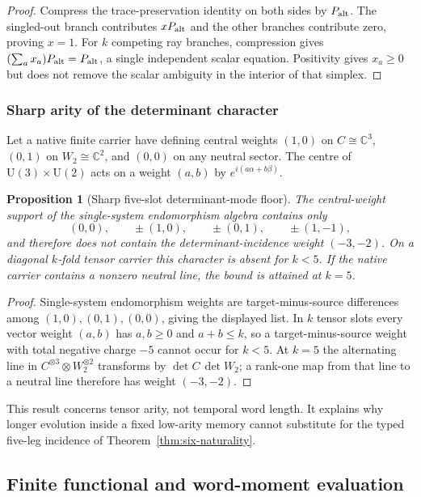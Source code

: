 \documentclass[11pt]{article}
\numberwithin{equation}{section}
\newtheorem{proposition}[theorem]{Proposition}
\theoremstyle{definition}
\theoremstyle{remark}
\newcommand{\C}{\mathbb C}
\newcommand{\U}{\mathrm U}
\begin{document}
\begin{proof}
Compress the trace-preservation identity on both sides by $P_{\rm alt}$.
The singled-out branch contributes $xP_{\rm alt}$ and the other branches
contribute zero, proving $x=1$.  For $k$ competing ray branches, compression
gives $(\sum_a x_a)P_{\rm alt}=P_{\rm alt}$, a single independent scalar
equation.  Positivity gives $x_a\ge0$ but does not remove the scalar
ambiguity in the interior of that simplex.
\end{proof}


\subsubsection{Sharp arity of the determinant character}

Let a native finite carrier have defining central weights $(1,0)$ on
$C\cong\C^3$, $(0,1)$ on $W_2\cong\C^2$, and $(0,0)$ on any neutral sector.
The centre of $\U(3)\times\U(2)$ acts on a weight $(a,b)$ by
$e^{i(a\alpha+b\beta)}$.

\begin{proposition}[Sharp five-slot determinant-mode floor]
\label{thm:determinant-arity-floor}
The central-weight support of the single-system endomorphism algebra contains
only
\[
 (0,0),\qquad \pm(1,0),\qquad \pm(0,1),\qquad \pm(1,-1),
\]
and therefore does not contain the determinant-incidence weight $(-3,-2)$.
On a diagonal $k$-fold tensor carrier this character is absent for $k<5$.
If the native carrier contains a nonzero neutral line, the bound is attained
at $k=5$.
\end{proposition}

\begin{proof}
Single-system endomorphism weights are target-minus-source differences among
$(1,0),(0,1),(0,0)$, giving the displayed list.  In $k$ tensor slots every
vector weight $(a,b)$ has $a,b\ge0$ and $a+b\le k$, so a target-minus-source
weight with total negative charge $-5$ cannot occur for $k<5$.  At $k=5$ the
alternating line in $C^{\otimes3}\otimes W_2^{\otimes2}$ transforms by
$\det C\,\det W_2$; a rank-one map from that line to a neutral line therefore
has weight $(-3,-2)$.
\end{proof}

This result concerns tensor arity, not temporal word length.  It explains why
longer evolution inside a fixed low-arity memory cannot substitute for the
typed five-leg incidence of Theorem~\ref{thm:six-naturality}.


\subsection{Finite functional and word-moment evaluation}
\end{document}
